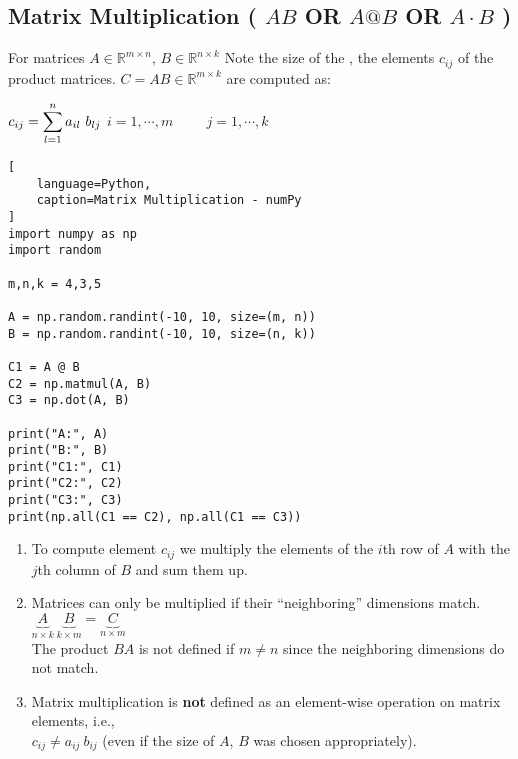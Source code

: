 \subsection{Matrix Multiplication ( $AB$ OR $A @ B$ OR $A\cdot B$ ) \cite{mfml/book/mml/Deisenroth-Faisal-Ong}}

For matrices $A \in \mathbb{R}^{m\times n}$, $B \in \mathbb{R}^{n\times k}$ Note the size of the , the elements $c_{ij}$ of the product matrices. $C = AB \in \mathbb{R}^{m\times k}$ are computed as:

\vspace{0.5cm}
\hfill
$
    c_{ij} = \dsum_{l=1}^n a_{il}\ b_{lj}
$
\hfill
$
    i = 1,\cdots,m
    \hspace{1cm}
    j = 1,\cdots,k
$
\hfill \cite{mfml/book/mml/Deisenroth-Faisal-Ong}


\begin{lstlisting}[
    language=Python,
    caption=Matrix Multiplication - numPy
]
import numpy as np
import random

m,n,k = 4,3,5

A = np.random.randint(-10, 10, size=(m, n))
B = np.random.randint(-10, 10, size=(n, k))

C1 = A @ B
C2 = np.matmul(A, B)
C3 = np.dot(A, B)

print("A:", A)
print("B:", B)
print("C1:", C1)
print("C2:", C2)
print("C3:", C3)
print(np.all(C1 == C2), np.all(C1 == C3))
\end{lstlisting}

\vspace{0.5cm}

\begin{enumerate}[itemsep=0.2cm]
    \item To compute element $c_{ij}$ we multiply the elements of the $i$th row of $A$ with the $j$th column of $B$ and sum them up.
    \hfill \cite{mfml/book/mml/Deisenroth-Faisal-Ong}

    \item Matrices can only be multiplied if their “neighboring” dimensions match.
    \hfill \cite{mfml/book/mml/Deisenroth-Faisal-Ong}
    \\
    \hfill
    $
        \underset{n\times k}{\underbrace{A}}\
        \underset{k\times m}{\underbrace{B}}
        =
        \underset{n\times m}{\underbrace{C}}
    $
    \hfill \cite{mfml/book/mml/Deisenroth-Faisal-Ong}
    \\
    The product $BA$ is not defined if $m \neq n$ since the neighboring dimensions do not match.

    \item Matrix multiplication is \textbf{not} defined as an element-wise operation on matrix elements, i.e., 
    \\
    $c_{ij} \neq a_{ij}\ b_{ij}$ (even if the size of $A$, $B$ was chosen appropriately).
    \hfill \cite{mfml/book/mml/Deisenroth-Faisal-Ong}
\end{enumerate}


